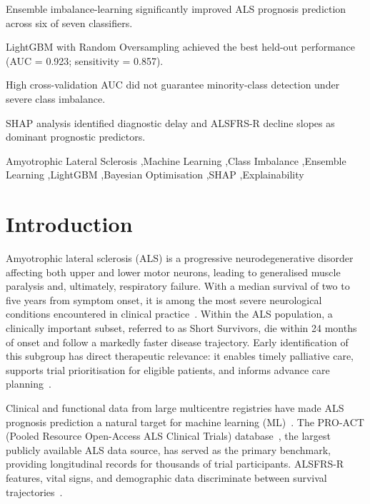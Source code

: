 \documentclass[preprint,12pt]{elsarticle}
\begin{document}
\begin{frontmatter}
\begin{highlights}
\item Ensemble imbalance-learning significantly improved ALS prognosis prediction across six of seven classifiers.
\item LightGBM with Random Oversampling achieved the best held-out performance (AUC = 0.923; sensitivity = 0.857).
\item High cross-validation AUC did not guarantee minority-class detection under severe class imbalance.
\item SHAP analysis identified diagnostic delay and ALSFRS-R decline slopes as dominant prognostic predictors.
\end{highlights}

\begin{keyword}
Amyotrophic Lateral Sclerosis \sep Machine Learning \sep Class
Imbalance \sep Ensemble Learning \sep LightGBM \sep Bayesian Optimisation
\sep SHAP \sep Explainability
\end{keyword}

\end{frontmatter}


\section{Introduction}
\label{sec:intro}

Amyotrophic lateral sclerosis (ALS) is a progressive neurodegenerative disorder
affecting both upper and lower motor neurons, leading to generalised muscle
paralysis and, ultimately, respiratory failure. With a median survival of two to
five years from symptom onset, it is among the most severe neurological
conditions encountered in clinical practice~\cite{Feldman2022}. Within the ALS
population, a clinically important subset, referred to as Short Survivors, die
within 24 months of onset and follow a markedly faster disease trajectory. Early
identification of this subgroup has direct therapeutic relevance: it enables
timely palliative care, supports trial prioritisation for eligible patients,
and informs advance care planning~\cite{Miller2012}.

Clinical and functional data from large multicentre registries have made ALS
prognosis prediction a natural target for machine learning (ML)~\cite{Grollemund2019,Papaiz2022}. The PRO-ACT (Pooled
Resource Open-Access ALS Clinical Trials) database~\cite{PROACT}, the largest
publicly available ALS data source, has served as the primary benchmark,
providing longitudinal records for thousands of trial participants.
ALSFRS-R features, vital signs, and demographic data discriminate between
survival trajectories~\cite{Ramamoorthy2022,Halbersberg2023}.
\end{document}
